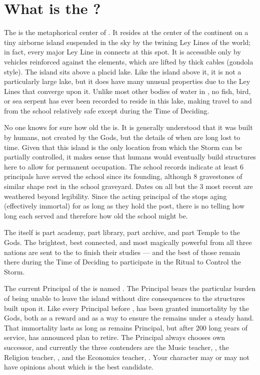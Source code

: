\documentclass[blue]{GL2020}
\begin{document}
\name{\bSchool{}}

\section*{What is the \pSchool{}?}
The \pSchool{} is the metaphorical center of \pEarth{}. It resides at the center of the continent on a tiny airborne island suspended in the sky by the twining Ley Lines of the world; in fact, every major Ley Line in \pEarth{} connects at this spot. It is accessible only by vehicles reinforced against the elements, which are lifted by thick cables (gondola style). The island sits above a placid lake. Like the island above it, it is not a particularly large lake, but it does have many unusual properties due to the Ley Lines that converge upon it. Unlike most other bodies of water in \pEarth{}, no fish, bird, or sea serpent has ever been recorded to reside in this lake, making travel to and from the school relatively safe except during the Time of Deciding.

No one knows for sure how old the \pSchool{} is. It is generally understood that it was built by humans, not created by the Gods, but the details of when are long lost to time. Given that this island is the only location from which the Storm can be partially controlled, it makes sense that humans would eventually build structures here to allow for permanent occupation. The school records indicate at least 6 principals have served the school since its founding, although 8 gravestones of similar shape rest in the school graveyard. Dates on all but the 3 most recent are weathered beyond legibility. Since the acting principal of the \pSc{} stops aging (effectively immortal) for as long as they hold the post, there is no telling how long each served and therefore how old the school might be.

The \pSc{} itself is part academy, part library, part archive, and part Temple to the Gods. The brightest, best connected, and most magically powerful from all three nations are sent to the \pSchool{} to finish their studies — and the best of those remain there during the Time of Deciding to participate in the Ritual to Control the Storm.

The current Principal of the \pSc{} is named \cPrincipal{\full}. The Principal bears the particular burden of being unable to leave the island without dire consequences to the structures built upon it. Like every Principal before \cPrincipal{\them}, \cPrincipal{} has been granted immortality by the Gods, both as a reward and as a way to ensure the \pSc{} remains under a steady hand. That immortality lasts as long as \cPrincipal{} remains Principal, but after 200 long years of service, \cPrincipal{\they} has announced \cPrincipal{\their} plan to retire. The Principal always chooses \cPrincipal{\their} own successor, and currently the three contenders are the Music teacher, \cMusic{\full}, the Religion teacher, \cBeetle{\full}, and the Economics teacher, \cChupSecond{}. Your character may or may not have opinions about which is the best candidate.
\end{document}
